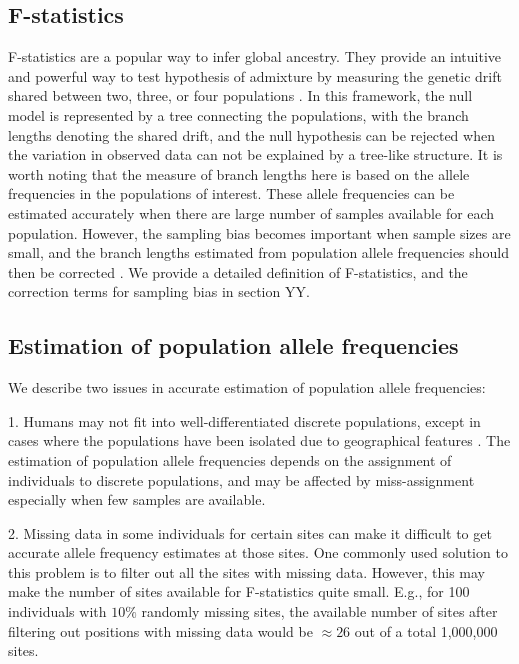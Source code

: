 \documentclass[12pt, letterpaper]{article}
\begin{document}
\subsection{F-statistics}
F-statistics are a popular way to infer global ancestry. They provide an intuitive and powerful way to test hypothesis of admixture by measuring the genetic drift shared between two, three, or four populations \cite{patterson_ancient_2012, peter_admixture_2016}. In this framework, the null model is represented by a tree connecting the populations, with the branch lengths denoting the shared drift, and the null hypothesis can be rejected when the variation in observed data can not be explained by a tree-like structure. It is worth noting that the measure of branch lengths here is based on the allele frequencies in the populations of interest. These allele frequencies can be estimated accurately when there are large number of samples available for each population. However, the sampling bias becomes important when sample sizes are small, and the branch lengths estimated from population allele frequencies should then be corrected \cite{patterson_ancient_2012, peter_admixture_2016}. We provide a detailed definition of F-statistics, and the correction terms for sampling bias in section YY.

\subsection{Estimation of population allele frequencies}
We describe two issues in accurate estimation of population allele frequencies:

1. Humans may not fit into well-differentiated discrete populations, except in cases where the populations have been isolated due to geographical features \cite{novembre_genes_2008}. The estimation of population allele frequencies depends on the assignment of individuals to discrete populations, and may be affected by miss-assignment especially when few samples are available. 

2. Missing data in some individuals for certain sites can make it difficult to get accurate allele frequency estimates at those sites. One commonly used solution to this problem is to filter out all the sites with missing data. However, this may make the number of sites available for F-statistics quite small. E.g., for 100 individuals with $10\%$ randomly missing sites, the available number of sites after filtering out positions with missing data would be $\approx26$ out of a total 1,000,000 sites. 
\end{document}
